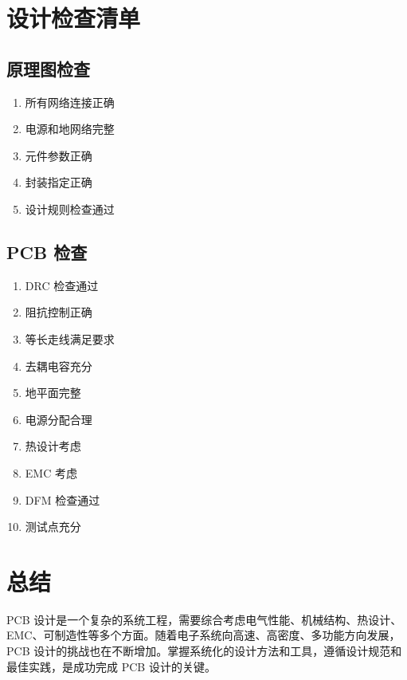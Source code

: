 \section{设计检查清单}

\subsection{原理图检查}

\begin{enumerate}
  \item 所有网络连接正确
  \item 电源和地网络完整
  \item 元件参数正确
  \item 封装指定正确
  \item 设计规则检查通过
\end{enumerate}

\subsection{PCB 检查}

\begin{enumerate}
  \item DRC 检查通过
  \item 阻抗控制正确
  \item 等长走线满足要求
  \item 去耦电容充分
  \item 地平面完整
  \item 电源分配合理
  \item 热设计考虑
  \item EMC 考虑
  \item DFM 检查通过
  \item 测试点充分
\end{enumerate}

\section{总结}

PCB 设计是一个复杂的系统工程，需要综合考虑电气性能、机械结构、热设计、EMC、可制造性等多个方面。随着电子系统向高速、高密度、多功能方向发展，PCB 设计的挑战也在不断增加。掌握系统化的设计方法和工具，遵循设计规范和最佳实践，是成功完成 PCB 设计的关键。
